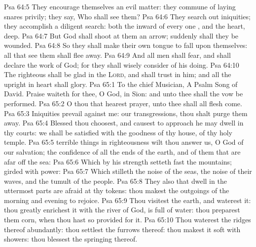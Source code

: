 \vs Psa 64:5 They encourage themselves  an evil matter: they commune of laying snares privily; they say, Who shall see them?
\vs Psa 64:6 They search out iniquities; they accomplish a diligent search: both the inward  of every one , and the heart,  deep.
\vs Psa 64:7 But God shall shoot at them  an arrow; suddenly shall they be wounded.
\vs Psa 64:8 So they shall make their own tongue to fall upon themselves: all that see them shall flee away.
\vs Psa 64:9 And all men shall fear, and shall declare the work of God; for they shall wisely consider of his doing.
\vs Psa 64:10 The righteous shall be glad in the \textsc{Lord}, and shall trust in him; and all the upright in heart shall glory.
\vs Psa 65:1 To the chief Musician, A Psalm  Song of David. Praise waiteth for thee, O God, in Sion: and unto thee shall the vow be performed.
\vs Psa 65:2 O thou that hearest prayer, unto thee shall all flesh come.
\vs Psa 65:3 Iniquities prevail against me:  our transgressions, thou shalt purge them away.
\vs Psa 65:4 Blessed  thou choosest, and causest to approach  he may dwell in thy courts: we shall be satisfied with the goodness of thy house,  of thy holy temple.
\vs Psa 65:5  terrible things in righteousness wilt thou answer us, O God of our salvation;  the confidence of all the ends of the earth, and of them that are afar off  the sea:
\vs Psa 65:6 Which by his strength setteth fast the mountains;  girded with power:
\vs Psa 65:7 Which stilleth the noise of the seas, the noise of their waves, and the tumult of the people.
\vs Psa 65:8 They also that dwell in the uttermost parts are afraid at thy tokens: thou makest the outgoings of the morning and evening to rejoice.
\vs Psa 65:9 Thou visitest the earth, and waterest it: thou greatly enrichest it with the river of God,  is full of water: thou preparest them corn, when thou hast so provided for it.
\vs Psa 65:10 Thou waterest the ridges thereof abundantly: thou settlest the furrows thereof: thou makest it soft with showers: thou blessest the springing thereof.
